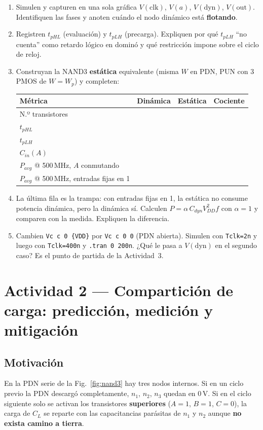 \documentclass[11pt,a4paper]{article}
\begin{document}
\begin{tarea}
\begin{enumerate}[nosep,leftmargin=*]
\item Simulen y capturen en una sola gráfica $V(\mathrm{clk})$, $V(a)$, $V(\mathrm{dyn})$, $V(\mathrm{out})$. Identifiquen las fases y anoten cuándo el nodo dinámico está \textbf{flotando}.
\item Registren $t_{pHL}$ (evaluación) y $t_{pLH}$ (precarga). Expliquen por qué $t_{pLH}$ ``no cuenta'' como retardo lógico en dominó y qué restricción impone sobre el ciclo de reloj.
\item Construyan la NAND3 \textbf{estática} equivalente (misma $W$ en PDN, PUN con 3 PMOS de $W=W_p$) y completen:
\begin{center}\small
\begin{tabular}{@{}lccc@{}}
\toprule
\textbf{Métrica} & \textbf{Dinámica} & \textbf{Estática} & \textbf{Cociente}\\
\midrule
N.º transistores &&&\\
$t_{pHL}$ &&&\\
$t_{pLH}$ &&&\\
$C_{in}(A)$ &&&\\
$P_{avg}$ @ 500\,MHz, $A$ conmutando &&&\\
$P_{avg}$ @ 500\,MHz, entradas fijas en 1 &&&\\
\bottomrule
\end{tabular}
\end{center}
\item La última fila es la trampa: con entradas fijas en 1, la estática no consume potencia dinámica, pero la dinámica sí. Calculen $P=\alpha\,C_{dyn}V_{DD}^2 f$ con $\alpha=1$ y comparen con la medida. Expliquen la diferencia.
\item Cambien \texttt{Vc c 0 \{VDD\}} por \texttt{Vc c 0 0} (PDN abierta). Simulen con \texttt{Tclk=2n} y luego con \texttt{Tclk=400n} y \texttt{.tran 0 200n}. ¿Qué le pasa a $V(\mathrm{dyn})$ en el segundo caso? Es el punto de partida de la Actividad~3.
\end{enumerate}
\end{tarea}

\section{Actividad 2 — Compartición de carga: predicción, medición y mitigación}

\subsection{Motivación}
En la PDN serie de la Fig.~\ref{fig:nand3} hay tres nodos internos. Si en un ciclo previo la PDN descargó completamente, $n_1$, $n_2$, $n_3$ quedan en 0\,V. Si en el ciclo siguiente solo se activan los transistores \textbf{superiores} ($A=1$, $B=1$, $C=0$), la carga de $C_L$ se reparte con las capacitancias parásitas de $n_1$ y $n_2$ aunque \textbf{no exista camino a tierra}.
\end{document}
